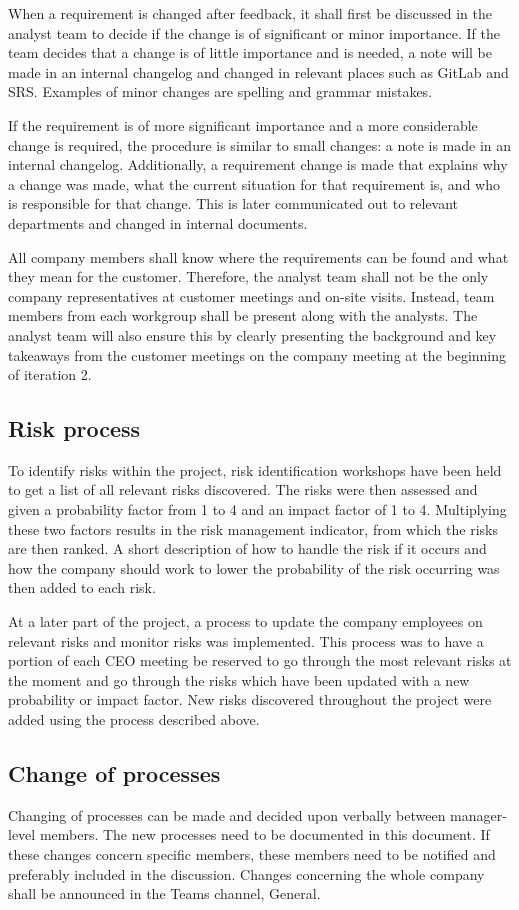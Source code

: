 When a requirement is changed after feedback, it shall first be discussed in the analyst team to decide if the change is of significant or minor importance. If the team decides that a change is of little importance and is needed, a note will be made in an internal changelog and changed in relevant places such as GitLab and SRS. Examples of minor changes are spelling and grammar mistakes. 

If the requirement is of more significant importance and a more considerable change is required, the procedure is similar to small changes: a note is made in an internal changelog. Additionally, a requirement change is made that explains why a change was made, what the current situation for that requirement is, and who is responsible for that change. This is later communicated out to relevant departments and changed in internal documents. 

All company members shall know where the requirements can be found and what they mean for the customer. Therefore, the analyst team shall not be the only company representatives at customer meetings and on-site visits. Instead, team members from each workgroup shall be present along with the analysts. The analyst team will also ensure this by clearly presenting the background and key takeaways from the customer meetings on the company meeting at the beginning of iteration 2. 

\subsection{Risk process}
To identify risks within the project, risk identification workshops have been held to get a list of all relevant risks discovered. The risks were then assessed and given a probability factor from 1 to 4 and an impact factor of 1 to 4. Multiplying these two factors results in the risk management indicator, from which the risks are then ranked. A short description of how to handle the risk if it occurs and how the company should work to lower the probability of the risk occurring was then added to each risk. 

At a later part of the project, a process to update the company employees on relevant risks and monitor risks was implemented. This process was to have a portion of each CEO meeting be reserved to go through the most relevant risks at the moment and go through the risks which have been updated with a new probability or impact factor. New risks discovered throughout the project were added using the process described above.


\subsection{Change of processes}
Changing of processes can be made and decided upon verbally between manager-level members. The new processes need to be documented in this document. If these changes concern specific members, these members need to be notified and preferably included in the discussion. Changes concerning the whole company shall be announced in the Teams channel, General.